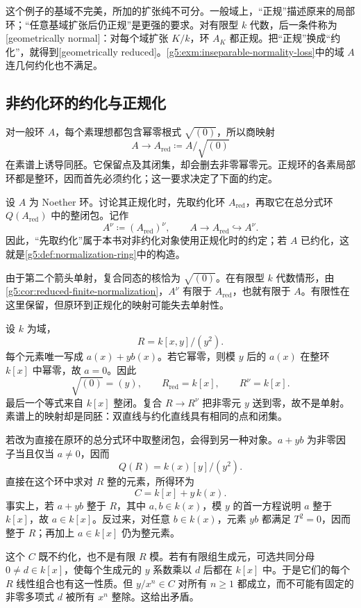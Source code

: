 这个例子的基域不完美，所加的扩张纯不可分。一般域上，“正规”描述原来的局部环；“任意基域扩张后仍正规”是更强的要求。对有限型 \(k\) 代数，后一条件称为[geometrically normal]：对每个域扩张 \(K/k\)，环 \(A_K\) 都正规。把“正规”换成“约化”，就得到[geometrically reduced]。\cref{g5:exm:inseparable-normality-loss}中的域 \(A\) 连几何约化也不满足。

\subsection{非约化环的约化与正规化}
\label{g5:subsec:0404:03}

对一般环 \(A\)，每个素理想都包含幂零根式 \(\sqrt{(0)}\)，所以商映射
\[
	A\longrightarrow A_{\mathrm{red}}\coloneqq A/\sqrt{(0)}
\]
在素谱上诱导同胚。它保留点及其闭集，却会删去非零幂零元。正规环的各素局部环都是整环，因而首先必须约化；这一要求决定了下面的约定。

\begin{definition}
\label{g5:def:normalization-nonreduced}
	设 \(A\) 为 Noether 环。讨论其正规化时，先取约化环 \(A_{\mathrm{red}}\)，再取它在总分式环 \(Q(A_{\mathrm{red}})\) 中的整闭包。记作
	\[
		A^\nu\coloneqq(A_{\mathrm{red}})^\nu,
		\qquad
		A\longrightarrow A_{\mathrm{red}}\hookrightarrow A^\nu.
	\]
	因此，“先取约化”属于本书对非约化对象使用正规化时的约定；若 \(A\) 已约化，这就是\cref{g5:def:normalization-ring}中的构造。
\end{definition}

由于第二个箭头单射，复合同态的核恰为 \(\sqrt{(0)}\)。在有限型 \(k\) 代数情形，由\cref{g5:cor:reduced-finite-normalization}，\(A^\nu\) 有限于 \(A_{\mathrm{red}}\)，也就有限于 \(A\)。有限性在这里保留，但原环到正规化的映射可能失去单射性。

\begin{example}
\label{g5:exm:double-line-reduction}
	设 \(k\) 为域，
	\[
		R=k[x,y]/(y^2).
	\]
	每个元素唯一写成 \(a(x)+y b(x)\)。若它幂零，则模 \(y\) 后的 \(a(x)\) 在整环 \(k[x]\) 中幂零，故 \(a=0\)。因此
	\[
		\sqrt{(0)}=(y),\qquad
		R_{\mathrm{red}}=k[x],\qquad
		R^\nu=k[x].
	\]
	最后一个等式来自 \(k[x]\) 整闭。复合 \(R\rightarrow R^\nu\) 把非零元 \(y\) 送到零，故不是单射。素谱上的映射却是同胚：双直线与约化直线具有相同的点和闭集。

	若改为直接在原环的总分式环中取整闭包，会得到另一种对象。\(a+yb\) 为非零因子当且仅当 \(a\ne0\)，因而
	\[
		Q(R)=k(x)[y]/(y^2).
	\]
	直接在这个环中求对 \(R\) 整的元素，所得环为
	\[
		C=k[x]+y\,k(x).
	\]
	事实上，若 \(a+yb\) 整于 \(R\)，其中 \(a,b\in k(x)\)，模 \(y\) 的首一方程说明 \(a\) 整于 \(k[x]\)，故 \(a\in k[x]\)。反过来，对任意 \(b\in k(x)\)，元素 \(yb\) 都满足 \(T^2=0\)，因而整于 \(R\)；再加上 \(a\in k[x]\) 仍为整元素。

	这个 \(C\) 既不约化，也不是有限 \(R\) 模。若有有限组生成元，可选共同分母 \(0\ne d\in k[x]\)，使每个生成元的 \(y\) 系数乘以 \(d\) 后都在 \(k[x]\) 中。于是它们的每个 \(R\) 线性组合也有这一性质。但 \(y/x^n\in C\) 对所有 \(n\geq1\) 都成立，而不可能有固定的非零多项式 \(d\) 被所有 \(x^n\) 整除。这给出矛盾。
\end{example}

